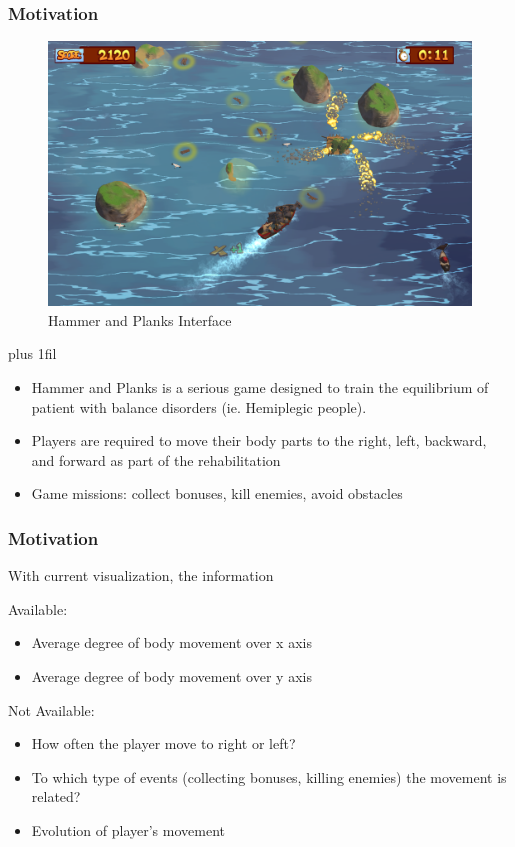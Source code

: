 \documentclass{beamer}
\makeatletter
\def\normaljustify{%
  \let\\\@centercr\rightskip\z@skip \leftskip\z@skip%
  \parfillskip=0pt plus 1fil}
\makeatother
\begin{document}
\begin{frame}
\frametitle{Motivation}
\centering
\begin{figure}
\includegraphics[scale=0.16]{images/hp_game.png}
\caption{Hammer and Planks Interface}
\end{figure}

\normaljustify
\begin{itemize}
\item Hammer and Planks is a serious game designed to train the equilibrium of patient with balance disorders (ie. Hemiplegic people).\\
\item Players are required to move their body parts to the right, left, backward, and forward as part of the rehabilitation
\item Game missions: collect bonuses, kill enemies, avoid obstacles
\end{itemize}

\end{frame}

\begin{frame}
\frametitle{Motivation}
With current visualization, the information

Available:
\begin{itemize}
\item Average degree of body movement over x axis
\item Average degree of body movement over y axis
\end{itemize}

Not Available:
\begin{itemize}
\item How often the player move to right or left?
\item To which type of events (collecting bonuses, killing enemies) the movement is related?
\item Evolution of player's movement
\end{itemize}

\end{frame}
\end{document}
